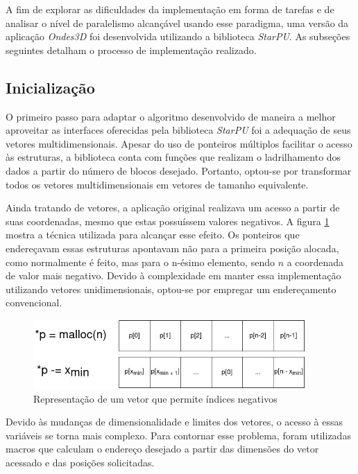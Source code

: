 \documentclass[cic,tc]{iiufrgs}
\begin{document}
A fim de explorar as dificuldades da implementação em forma de tarefas e de analisar o nível de paralelismo alcançável usando esse paradigma, uma versão da aplicação \textit{Ondes3D} foi
desenvolvida utilizando a biblioteca \textit{StarPU}. As subseções seguintes detalham o processo de implementação realizado.

\subsection{Inicialização}

O primeiro passo para adaptar o algoritmo desenvolvido de maneira a melhor aproveitar as interfaces oferecidas pela biblioteca \textit{StarPU} foi a adequação de seus vetores multidimensionais. Apesar
do uso de ponteiros múltiplos facilitar o acesso às estruturas, a biblioteca conta com funções que realizam o ladrilhamento dos dados a partir do número de blocos desejado. Portanto, optou-se por
transformar todos os vetores multidimensionais em vetores de tamanho equivalente.

Ainda tratando de vetores, a aplicação original realizava um acesso a partir de suas coordenadas, mesmo que estas possuíssem valores negativos. A figura \ref{fig:negative_index} mostra a
técnica utilizada para alcançar esse efeito. Os ponteiros que endereçavam essas estruturas apontavam não para a primeira posição alocada, como normalmente é feito, mas para o n-ésimo elemento,
sendo $n$ a coordenada de valor mais negativo. Devido à complexidade em manter essa implementação utilizando vetores unidimensionais, optou-se por empregar um endereçamento convencional.

\begin{figure}[!htb]
    \caption{Representação de um vetor que permite índices negativos}
    \begin{center}
      \includegraphics[width=28em]{negative_index}
    \end{center}
    \label{fig:negative_index}
\end{figure}

Devido às mudanças de dimensionalidade e limites dos vetores, o acesso à essas variáveis se torna mais complexo. Para contornar esse problema, foram utilizadas macros que calculam o endereço
desejado a partir das dimensões do vetor acessado e das posições solicitadas.
\end{document}
